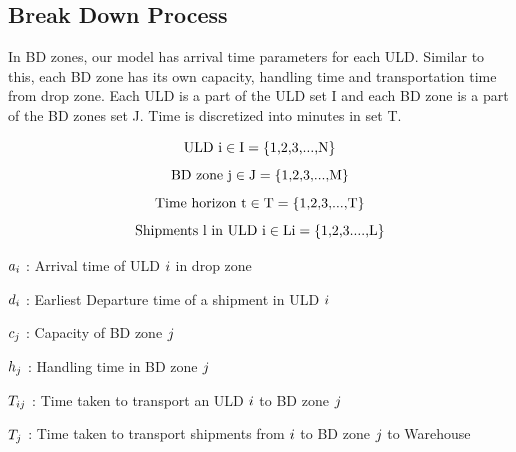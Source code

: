 \documentclass[11pt,a4paper,fleqn]{article}
\begin{document}
\subsection{Break Down Process}
\label{sec:ParamBDZone}

In BD zones, our model has arrival time parameters for each ULD. Similar to this, each BD zone has its own capacity, handling time and transportation time from drop zone. Each ULD is a part of the ULD set I and each BD zone is a part of the BD zones set J. Time is discretized into minutes in set T.

\begin{equation*} ${\color{black} ULD i}$ {}  \in {}  ${\color{black}I}$ {} = {} ${\color{black}\{1,2,3,...,N\}}$  \end{equation*} 
\begin{equation*} ${\color{black} BD zone j}$ {}  \in {}  ${\color{black}J}$ {} = {} ${\color{black}\{1,2,3,...,M\}}$ \end{equation*} 
\begin{equation*} ${\color{black} Time horizon t}$ {}  \in {}  ${\color{black}T}$ {} = {} ${\color{black}\{1,2,3,...,T\}}$ \end{equation*}
\begin{equation*} ${\color{black} Shipments l in ULD i}$ {}  \in {}  ${\color{black}Li}$ {} = {} ${\color{black}\{1,2,3....,L\}}$ \end{equation*} %


${\color{black}a_{i}}$ : Arrival time of ULD ${\color{black}i}$ in drop zone 

${\color{black}d_{i}}$ : Earliest Departure time of a shipment in ULD ${\color{black}i}$ 



${\color{black}c_{j}}$ : Capacity of BD zone ${\color{black}j}$

$\textcolor{black}{h_{j}}$ : Handling time in BD zone ${\color{black}j}$

$\textcolor{black}{T_{ij}}$ : Time taken to transport an ULD ${\color{black}i}$ to BD zone ${\color{black}j}$

$\textcolor{black}{T_{j}}$ : Time taken to transport shipments from ${\color{black}i}$ to BD zone ${\color{black}j}$ to Warehouse
\end{document}
